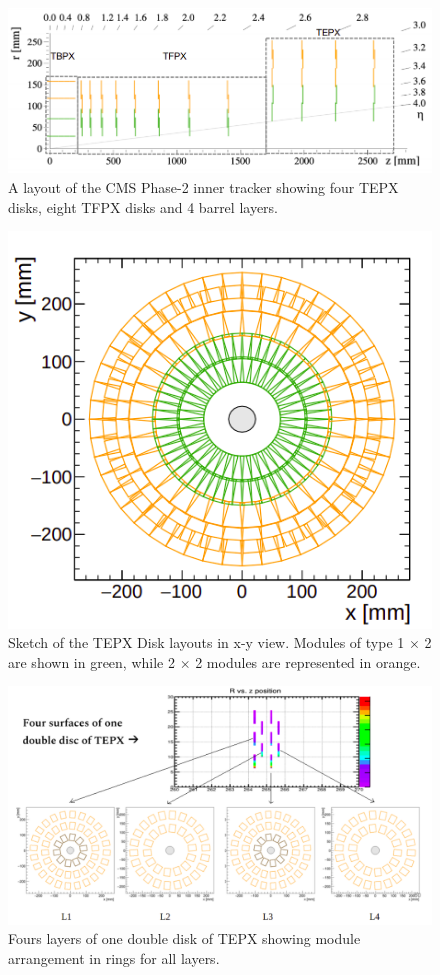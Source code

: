\begin{figure}[H]
  \centering
  \includegraphics[width=0.8\columnwidth]{./tepx_geometry.png}
  \caption{ \onehalfspacing A layout of the CMS Phase-2 inner tracker showing four TEPX disks, eight TFPX disks and 4 barrel layers. \cite{Klein:2017nke}}
  \label{fig:CMS}
\end{figure}


\begin{figure}[H]
  \centering
  \includegraphics[width=0.5 \columnwidth]{./xydisc.png}
  \caption{ \onehalfspacing Sketch of the TEPX Disk layouts in x-y view. Modules of type 1 $\times$ 2 are shown in green, while 2 $\times$ 2 modules are represented in orange.}
  \label{fig:CMS}
\end{figure}

\begin{figure}[H]
  \centering
  \includegraphics[width=1 \columnwidth]{./fourlayers.png}
  \caption{ \onehalfspacing Fours layers of one double disk of TEPX showing module arrangement in rings for all layers.}
  \label{fig:CMS}
\end{figure}




